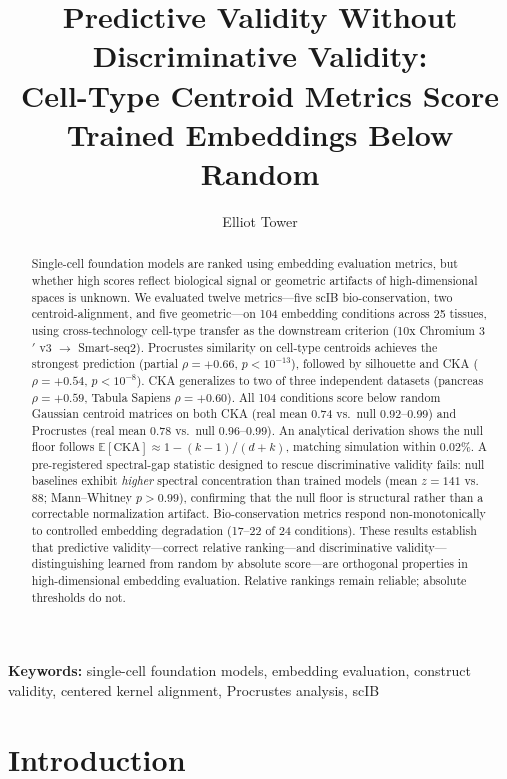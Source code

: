 \documentclass[11pt]{article}
\title{Predictive Validity Without Discriminative Validity:\\
Cell-Type Centroid Metrics Score Trained Embeddings Below Random}
\author{Elliot Tower}
\affil{Independent Researcher \\ \texttt{elliot@elliottower.ai}}
\date{}
\begin{document}
\linenumbers
\maketitle

\begin{abstract}
Single-cell foundation models are ranked using embedding evaluation
metrics, but whether high scores reflect biological signal or geometric
artifacts of high-dimensional spaces is unknown. We evaluated twelve
metrics---five scIB bio-conservation, two centroid-alignment, and five
geometric---on 104 embedding conditions across 25 tissues, using
cross-technology cell-type transfer as the downstream criterion (10x
Chromium 3$'$ v3 $\rightarrow$ Smart-seq2). Procrustes similarity on
cell-type centroids achieves the strongest prediction (partial
$\rho = +0.66$, $p < 10^{-13}$), followed by silhouette and CKA
($\rho = +0.54$, $p < 10^{-8}$). CKA generalizes to two of three
independent datasets (pancreas $\rho = +0.59$, Tabula Sapiens
$\rho = +0.60$). All 104 conditions score below random Gaussian
centroid matrices on both CKA (real mean 0.74 vs.\ null 0.92--0.99)
and Procrustes (real mean 0.78 vs.\ null 0.96--0.99). An
analytical derivation shows the null floor follows
$\mathbb{E}[\mathrm{CKA}] \approx 1 - (k{-}1)/(d{+}k)$, matching
simulation within 0.02\%. A pre-registered spectral-gap statistic
designed to rescue discriminative validity fails: null baselines
exhibit \emph{higher} spectral concentration than trained models
(mean $z = 141$ vs.\ $88$; Mann--Whitney $p > 0.99$), confirming
that the null floor is structural rather than a correctable
normalization artifact. Bio-conservation metrics respond
non-monotonically to controlled embedding degradation (17--22 of 24
conditions). These results establish that predictive
validity---correct relative ranking---and discriminative
validity---distinguishing learned from random by absolute score---are
orthogonal properties in high-dimensional embedding evaluation.
Relative rankings remain reliable; absolute thresholds do not.
\end{abstract}

\noindent\textbf{Keywords:} single-cell foundation models, embedding evaluation, construct validity, centered kernel alignment, Procrustes analysis, scIB

\section{Introduction}
\label{sec:intro}
\end{document}
